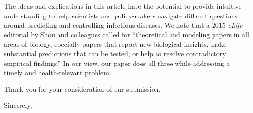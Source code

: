 \documentclass[10pt]{letter}
\begin{document}
\begin{letter}{
}
The ideas and explications in this article have the potential to provide intuitive understanding to help scientists and policy-makers navigate difficult questions around predicting and controlling infectious diseases.
We note that a 2015 \emph{eLife} editorial by Shou and colleagues \cite{shou2015theory} called for ``theoretical and modeling papers in all areas of biology, epecially papers that report new biological insights, make substantial predictions that can be tested, or help to resolve contradictory empirical findings.''
In our view, our paper does all three while addressing a timely and health-relevant problem.

Thank you for your consideration of our submission.

\closing{Sincerely,}



\end{letter}
\end{document}
